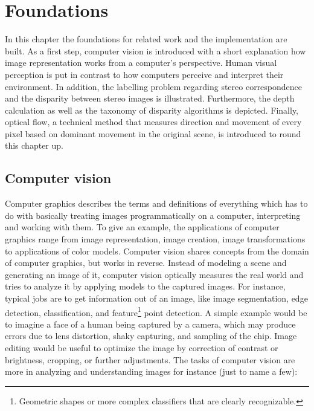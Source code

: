 \chapter{Foundations}
\label{chap:foundations}

In this chapter the foundations for related work and the implementation are built.
As a first step, computer vision is introduced with a short explanation how image representation works from a computer's perspective.
Human visual perception is put in contrast to how computers perceive and interpret their environment.
In addition, the labelling problem regarding stereo correspondence and the disparity between stereo images is illustrated.
Furthermore, the depth calculation as well as the taxonomy of disparity algorithms is depicted.
Finally, optical flow, a technical method that measures direction and movement of every pixel based on dominant movement in the original scene, is introduced to round this chapter up.

\section{Computer vision}

Computer graphics describes the terms and definitions of everything which has to do with basically treating images programmatically on a computer, interpreting and working with them.
To give an example, the applications of computer graphics range from image representation, image creation, image transformations to applications of color models.
Computer vision shares concepts from the domain of computer graphics, but works in reverse.
Instead of modeling a scene and generating an image of it, computer vision optically measures the real world and tries to analyze it by applying models to the captured images.
For instance, typical jobs are to get information out of an image, like image segmentation, edge detection, classification, and feature\footnote{Geometric shapes or more complex classifiers that are clearly recognizable.} point detection.
\newline\newline\noindent A simple example would be to imagine a face of a human being captured by a camera, which may produce errors due to lens distortion, shaky capturing, and sampling of the chip.
Image editing would be useful to optimize the image by correction of contrast or brightness, cropping, or further adjustments.
The tasks of computer vision are more in analyzing and understanding images for instance (just to name a few):

